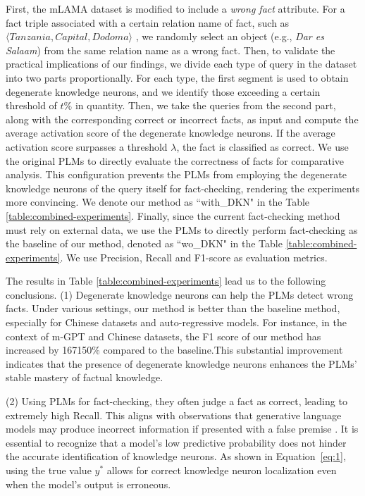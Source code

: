 \documentclass[]{article}
\begin{document}
First, the mLAMA dataset is modified to include a \textit{wrong fact} attribute.
For a fact triple associated with a certain relation name of fact, such as $\langle \textit{Tanzania}, \textit{Capital}, \textit{Dodoma} \rangle$ , we randomly select an object (e.g., \textit{Dar es Salaam}) from the same relation name as a wrong fact.
Then, to validate the practical implications of our findings, we divide each type of query in the dataset into two parts proportionally. For each type, the first segment is used to obtain degenerate knowledge neurons, and we identify those exceeding a certain threshold of \( t\% \) in quantity.
Then, we take the queries from the second part, along with the corresponding correct or incorrect facts, as input and compute the average activation score of the degenerate knowledge neurons. If the average activation score surpasses a threshold $\lambda$, the fact is classified as correct.
We use the original PLMs to directly evaluate the correctness of facts for comparative analysis. This configuration prevents the PLMs from employing the degenerate knowledge neurons of the query itself for fact-checking, rendering the experiments more convincing. We denote our method as ``with\_DKN" in the Table \ref{table:combined-experiments}.
Finally, since the current fact-checking method must rely on external data, we use the PLMs to directly perform fact-checking as the baseline of our method, denoted as ``wo\_DKN" in the Table \ref{table:combined-experiments}. We use Precision, Recall and F1-score as evaluation metrics.

The results in Table \ref{table:combined-experiments} lead us to the following conclusions.  (1) Degenerate knowledge neurons can help the PLMs detect wrong facts. Under various settings, our method is better than the baseline method, especially for Chinese datasets and auto-regressive models. For instance, in the context of m-GPT and Chinese datasets, the F1 score of our method has increased by 167150\% compared to the baseline.This substantial improvement indicates that the presence of degenerate knowledge neurons enhances the PLMs' stable mastery of factual knowledge.

(2) Using PLMs for fact-checking, they often judge a fact as correct, leading to extremely high Recall. This aligns with observations that generative language models may produce incorrect information if presented with a false premise \cite{hallucination_chatgpt3, lakshmanan2022large, metz2022new}.
It is essential to recognize that a model's low predictive probability does not hinder the accurate identification of knowledge neurons. As shown in Equation~\ref{eq:1}, using the true value \( y^* \) allows for correct knowledge neuron localization even when the model's output is erroneous.
\end{document}
